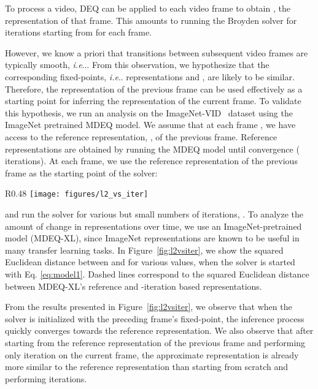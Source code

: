 \documentclass[runningheads]{llncs}
\makeatletter
\DeclareRobustCommand\onedot{\futurelet\@let@token\@onedot}
\def\@onedot{\ifx\@let@token.\else.\null\fi\xspace}
\def\ie{\emph{i.e}\onedot} \def\Ie{\emph{I.e}\onedot}
\makeatother
\begin{document}
To process a video, DEQ can be applied to each video frame  to obtain , the representation of that frame. This amounts to running the Broyden solver for  iterations starting from  for each frame. 


However, we know a priori that transitions between subsequent video frames are typically smooth, \ie . From this observation, we hypothesize that the corresponding fixed-points, \ie representations  and , are likely to be similar. Therefore, the representation of the previous frame can be used effectively as a starting point for inferring the representation of the current frame. To validate this hypothesis, we run an analysis on the ImageNet-VID~\cite{imagenetviddataset} dataset using the ImageNet pretrained MDEQ model. We assume that at each frame , we have access to the reference representation, , of the previous frame. Reference representations are obtained by running the MDEQ model until convergence ( iterations). At each frame, we use the reference representation of the previous frame as the starting point of the solver: 




\begin{wrapfigure}[17]{R}{0.48\textwidth}
    \texttt{[image: figures/l2\_vs\_iter]}
  \caption{Squared Euclidean approximation error as a function of inference steps, when the solver is initialized with the reference representation of the preceding frame\label{fig:l2vsiter}}
\end{wrapfigure}




\noindent and run the solver for various but small numbers of iterations, . To analyze the amount of change in representations over time, we use an ImageNet-pretrained model (MDEQ-XL), since ImageNet representations are known to be useful in many transfer learning tasks. In  Figure~\ref{fig:l2vsiter}, we show the squared Euclidean distance between  and   for various  values, when the solver is started with Eq. \ref{eq:model1}. Dashed lines correspond to the squared Euclidean distance between MDEQ-XL’s reference and -iteration based representations.


From the results presented in Figure~\ref{fig:l2vsiter}, we observe that when the solver is initialized with the preceding frame's fixed-point, the inference process quickly converges towards the reference representation.  We also observe that after starting from the reference representation of the previous frame and performing only  iteration on the current frame, the approximate representation is already more similar  to the reference representation than starting from scratch and performing  iterations. 
\end{document}

